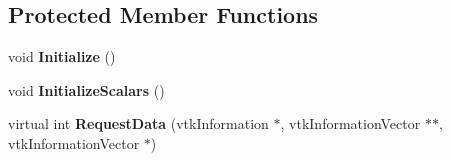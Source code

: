 \subsection*{Protected Member Functions}
\begin{DoxyCompactItemize}
\item 
\hypertarget{classvtkCellsFilter_a5dd374d00109c7f750288fb186be0f30}{
void {\bfseries Initialize} ()}
\label{classvtkCellsFilter_a5dd374d00109c7f750288fb186be0f30}

\item 
\hypertarget{classvtkCellsFilter_adf17151e234e13a2040268529a320dfb}{
void {\bfseries InitializeScalars} ()}
\label{classvtkCellsFilter_adf17151e234e13a2040268529a320dfb}

\item 
\hypertarget{classvtkCellsFilter_aa7029a2eb18e53ff1c81461880796d30}{
virtual int {\bfseries RequestData} (vtkInformation $\ast$, vtkInformationVector $\ast$$\ast$, vtkInformationVector $\ast$)}
\label{classvtkCellsFilter_aa7029a2eb18e53ff1c81461880796d30}

\end{DoxyCompactItemize}
